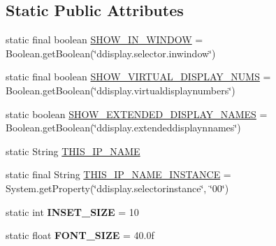 \subsection*{Static Public Attributes}
\begin{DoxyCompactItemize}
\item 
static final boolean \hyperlink{classgov_1_1fnal_1_1ppd_1_1dd_1_1GlobalVariables_af0e7b37c8bf6495b999b93ed0f4f1c76}{S\-H\-O\-W\-\_\-\-I\-N\-\_\-\-W\-I\-N\-D\-O\-W} = Boolean.\-get\-Boolean(\char`\"{}ddisplay.\-selector.\-inwindow\char`\"{})
\item 
static final boolean \hyperlink{classgov_1_1fnal_1_1ppd_1_1dd_1_1GlobalVariables_a7ccfa5abda77efe03cd888f14d4171a3}{S\-H\-O\-W\-\_\-\-V\-I\-R\-T\-U\-A\-L\-\_\-\-D\-I\-S\-P\-L\-A\-Y\-\_\-\-N\-U\-M\-S} = Boolean.\-get\-Boolean(\char`\"{}ddisplay.\-virtualdisplaynumbers\char`\"{})
\item 
static boolean \hyperlink{classgov_1_1fnal_1_1ppd_1_1dd_1_1GlobalVariables_a24c624ba470a455c7ed0c43d72a9f417}{S\-H\-O\-W\-\_\-\-E\-X\-T\-E\-N\-D\-E\-D\-\_\-\-D\-I\-S\-P\-L\-A\-Y\-\_\-\-N\-A\-M\-E\-S} = Boolean.\-get\-Boolean(\char`\"{}ddisplay.\-extendeddisplaynnames\char`\"{})
\item 
static String \hyperlink{classgov_1_1fnal_1_1ppd_1_1dd_1_1GlobalVariables_a35adf140ccbaaf275e34d1539424828a}{T\-H\-I\-S\-\_\-\-I\-P\-\_\-\-N\-A\-M\-E}
\item 
static final String \hyperlink{classgov_1_1fnal_1_1ppd_1_1dd_1_1GlobalVariables_ae5fe9c75fedaa742e5f68baad8768d7f}{T\-H\-I\-S\-\_\-\-I\-P\-\_\-\-N\-A\-M\-E\-\_\-\-I\-N\-S\-T\-A\-N\-C\-E} = System.\-get\-Property(\char`\"{}ddisplay.\-selectorinstance\char`\"{}, \char`\"{}00\char`\"{})
\item 
\hypertarget{classgov_1_1fnal_1_1ppd_1_1dd_1_1GlobalVariables_a938952f27836544cbcf8eed0fceecb99}{static int {\bfseries I\-N\-S\-E\-T\-\_\-\-S\-I\-Z\-E} = 10}\label{classgov_1_1fnal_1_1ppd_1_1dd_1_1GlobalVariables_a938952f27836544cbcf8eed0fceecb99}

\item 
\hypertarget{classgov_1_1fnal_1_1ppd_1_1dd_1_1GlobalVariables_a9331af89f789ea1b54581c0198f7a43d}{static float {\bfseries F\-O\-N\-T\-\_\-\-S\-I\-Z\-E} = 40.\-0f}\label{classgov_1_1fnal_1_1ppd_1_1dd_1_1GlobalVariables_a9331af89f789ea1b54581c0198f7a43d}


\end{DoxyCompactItemize}
